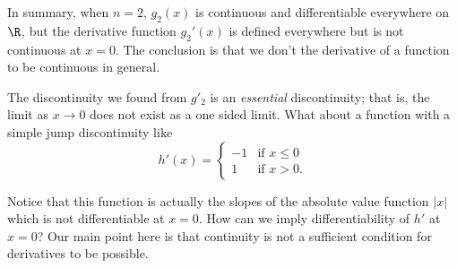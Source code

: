 In summary, when \( n = 2  \), \( g_2(x)  \) is continuous and differentiable everywhere on \( \R  \), but the derivative function \( g_2'(x)   \) is defined everywhere but is not continuous at \( x = 0  \). The conclusion is that we don't the derivative of a function to be continuous in general.

The discontinuity we found from \( g'_2  \) is an \textit{essential} discontinuity; that is, the limit as \( x \to 0  \) does not exist as a one sided limit. What about a function with a simple jump discontinuity like 
\[  h'(x) = 
\begin{cases}
    -1 &\text{if } x \leq 0 \\
    1 &\text{if } x> 0.
\end{cases} \]

Notice that this function is actually the slopes of the absolute value function \( | x |  \) which is not differentiable at \( x = 0  \). How can we imply differentiability of \( h'  \) at \( x = 0  \)? Our main point here is that continuity is not a sufficient condition for derivatives to be possible.

